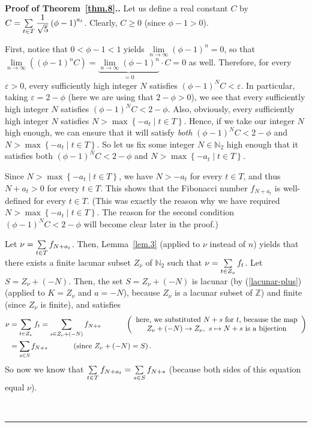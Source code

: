 \documentclass[numbers=enddot,12pt,final,onecolumn,notitlepage]{scrartcl}%
\numberwithin{exer}{section}
\theoremstyle{definition}
\newenvironment{proof}[1][Proof]{\noindent\textbf{#1.} }{\ \rule{0.5em}{0.5em}}
\let\sumnonlimits\sum
\renewcommand{\sum}{\sumnonlimits\limits}
\begin{document}
\begin{proof}[Proof of Theorem~\ref{thm.8}.] Let us define a real constant $C$ by
$C=\sum\limits_{t\in T}\dfrac{1}{\sqrt{5}}\left(  \phi-1\right)  ^{a_{t}}$.
Clearly, $C\geq0$ (since $\phi-1>0$).

First, notice that $0<\phi-1<1$ yields $\lim\limits_{n\rightarrow\infty
}\left(  \phi-1\right)  ^{n}=0$, so that $\lim\limits_{n\rightarrow\infty
}\left(  \left(  \phi-1\right)  ^{n}C\right)  =\underbrace{\lim
\limits_{n\rightarrow\infty}\left(  \phi-1\right)  ^{n}}_{=0}\cdot C=0$ as
well. Therefore, for every $\varepsilon>0$, every sufficiently high integer
$N$ satisfies $\left(  \phi-1\right)  ^{N}C<\varepsilon$. In particular,
taking $\varepsilon=2-\phi$ (here we are using that $2-\phi>0$), we see that
every sufficiently high integer $N$ satisfies $\left(  \phi-1\right)
^{N}C<2-\phi$. Also, obviously, every sufficiently high integer $N$ satisfies
$N>\max\left\{  -a_{t}\mid t\in T\right\}  $. Hence, if we take our integer
$N$ high enough, we can ensure that it will satisfy \textit{both} $\left(
\phi-1\right)  ^{N}C<2-\phi$ and $N>\max\left\{  -a_{t}\mid t\in T\right\}  $.
So let us fix some integer $N\in\mathbb{N}_{2}$ high enough that it satisfies
both $\left(  \phi-1\right)  ^{N}C<2-\phi$ and $N>\max\left\{  -a_{t}\mid t\in
T\right\}  $.

Since $N>\max\left\{  -a_{t}\mid t\in T\right\}  $, we have $N>-a_{t}$ for
every $t\in T$, and thus $N+a_{t}>0$ for every $t\in T$. This shows that the
Fibonacci number $f_{N+a_{t}}$ is well-defined for every $t\in T$. (This was
exactly the reason why we have required $N>\max\left\{  -a_{t}\mid t\in
T\right\}  $. The reason for the second condition $\left(  \phi-1\right)
^{N}C<2-\phi$ will become clear later in the proof.)

Let $\nu=\sum\limits_{t\in T}f_{N+a_{t}}$. Then, Lemma~\ref{lem.3} (applied to $\nu$
instead of $n$) yields that there exists a finite lacunar subset $Z_{\nu}$ of
$\mathbb{N}_{2}$ such that $\nu=\sum\limits_{t\in Z_{\nu}}f_{t}$. Let
$S=Z_{\nu}+\left(  -N\right)  $. Then, the set $S=Z_{\nu}+\left(  -N\right)  $
is lacunar (by (\ref{lacunar-plus}) (applied to $K=Z_{\nu}$ and $a=-N$),
because $Z_{\nu}$ is a lacunar subset of $\mathbb{Z}$) and finite (since
$Z_{\nu}$ is finite), and satisfies%
\begin{align*}
\nu &  =\sum\limits_{t\in Z_{\nu}}f_{t}=\sum\limits_{s\in Z_{\nu}+\left(
-N\right)  }f_{N+s}\ \ \ \ \ \ \ \ \ \ \left(
\begin{array}
[c]{c}%
\text{here, we substituted }N+s\text{ for }t\text{, because the map}\\
Z_{\nu}+\left(  -N\right)  \rightarrow Z_{\nu},\text{ }s\mapsto N+s\text{ is a
bijection}%
\end{array}
\right) \\
&  =\sum\limits_{s\in S}f_{N+s}\ \ \ \ \ \ \ \ \ \ \left(  \text{since }%
Z_{\nu}+\left(  -N\right)  =S\right)  .
\end{align*}
So now we know that $\sum\limits_{t\in T}f_{N+a_{t}}=\sum\limits_{s\in
S}f_{N+s}$ (because both sides of this equation equal $\nu$).


\end{proof}
\end{document}
